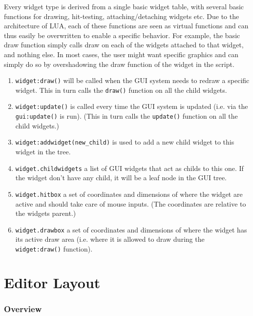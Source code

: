 Every widget type is derived from a single basic widget table, with several basic functions for drawing, hit-testing, attaching/detaching widgets etc. Due to the architecture of LUA, each of these functions are seen as virtual functions and can thus easily be overwritten to enable a specific behavior. For example, the basic draw function simply calls draw on each of the widgets attached to that widget, and nothing else. In most cases, the user might want specific graphics and can simply do so by overshadowing the draw function of the widget in the script. 
\begin{enumerate}
  \item \texttt{widget:draw()} will be called when the GUI system needs to redraw a specific widget. This in turn calls the \texttt{draw()} function on all the child widgets.
  \item \texttt{widget:update()} is called every time the GUI system is updated (i.e. via the \texttt{gui:update()} is run). (This in turn calls the \texttt{update()} function on all the child widgets.)
  \item \texttt{widget:addwidget(new\_child)} is used to add a new child widget to this widget in the tree.
  \item \texttt{widget.childwidgets} a list of GUI widgets that act as childs to this one. If the widget don't have any child, it will be a leaf node in the GUI tree.
  \item \texttt{widget.hitbox} a set of coordinates and dimensions of where the widget are active and should take care of mouse inputs. (The coordinates are relative to the widgets parent.)
  \item \texttt{widget.drawbox} a set of coordinates and dimensions of where the widget has its active draw area (i.e. where it is allowed to draw during the \texttt{widget:draw()} function).
\end{enumerate}

\section{Editor Layout}

\subsubsection{Overview}


